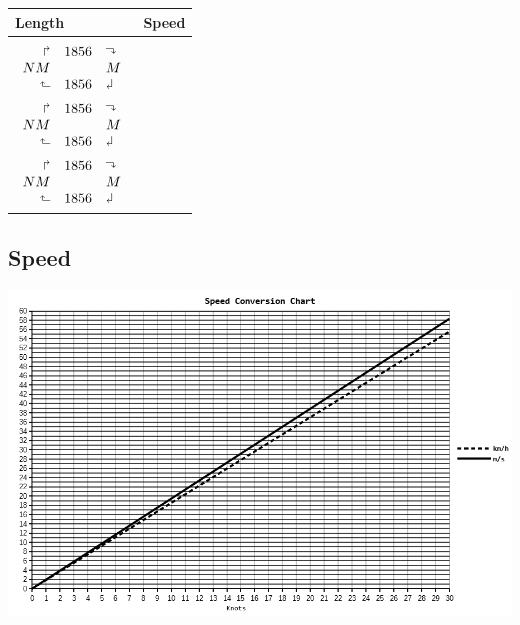 \documentclass{article}
\newcommand{\aUR}{\Rsh} %
\newcommand{\aLU}{\rotatebox[origin=c]{90}{$\Rsh$}} %
\newcommand{\aDL}{\rotatebox[origin=c]{180}{$\Rsh$}} %
\newcommand{\aRD}{\rotatebox[origin=c]{270}{$\Rsh$}} %
\begin{document}
\begin{center}
\setlength{\extrarowheight}{0pt}
\begin{large}
\begin{tabularx}{\textwidth}{Y | Y}
 Length & Speed \\
\hline
\\

$\begin{array}{rcl}
\aUR & 1856 & \aRD \\
NM &  & M \\
\aLU & 1856 &  \aDL \\
\end{array}$

& \\

$\begin{array}{rcl}
\aUR & 1856 & \aRD \\
NM &  & M \\
\aLU & 1856 &  \aDL \\
\end{array}$

& \\

$\begin{array}{rcl}
\aUR & 1856 & \aRD \\
NM &  & M \\
\aLU & 1856 &  \aDL \\
\end{array}$


\end{tabularx}
\end{large}
\end{center}



\subsection{Speed}

\includegraphics[width=\textwidth]{speedConversion}
\pagebreak
\end{document}
